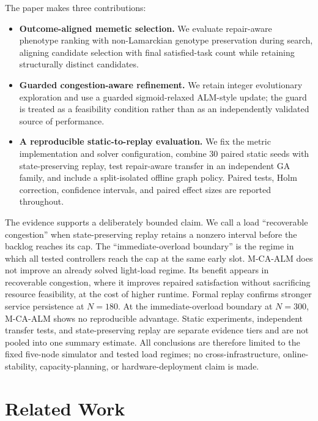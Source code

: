 \documentclass[pdflatex,sn-mathphys-num]{sn-jnl}
\begin{document}
The paper makes three contributions:
\begin{itemize}
    \item \textbf{Outcome-aligned memetic selection.} We evaluate repair-aware phenotype ranking with non-Lamarckian genotype preservation during search, aligning candidate selection with final satisfied-task count while retaining structurally distinct candidates.
    \item \textbf{Guarded congestion-aware refinement.} We retain integer evolutionary exploration and use a guarded sigmoid-relaxed ALM-style update; the guard is treated as a feasibility condition rather than as an independently validated source of performance.
    \item \textbf{A reproducible static-to-replay evaluation.} We fix the metric implementation and solver configuration, combine 30 paired static seeds with state-preserving replay, test repair-aware transfer in an independent GA family, and include a split-isolated offline graph policy. Paired tests, Holm correction, confidence intervals, and paired effect sizes are reported throughout.
\end{itemize}

The evidence supports a deliberately bounded claim. We call a load ``recoverable congestion'' when state-preserving replay retains a nonzero interval before the backlog reaches its cap. The ``immediate-overload boundary'' is the regime in which all tested controllers reach the cap at the same early slot. M-CA-ALM does not improve an already solved light-load regime. Its benefit appears in recoverable congestion, where it improves repaired satisfaction without sacrificing resource feasibility, at the cost of higher runtime. Formal replay confirms stronger service persistence at $N=180$. At the immediate-overload boundary at $N=300$, M-CA-ALM shows no reproducible advantage. Static experiments, independent transfer tests, and state-preserving replay are separate evidence tiers and are not pooled into one summary estimate. All conclusions are therefore limited to the fixed five-node simulator and tested load regimes; no cross-infrastructure, online-stability, capacity-planning, or hardware-deployment claim is made.



\section{Related Work}
\end{document}
